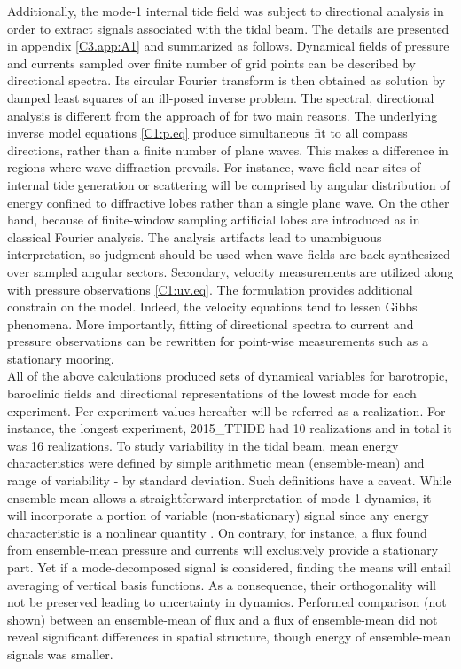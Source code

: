 \documentclass[12pt]{article}
\begin{document}
Additionally, the mode-1 internal tide field was subject to directional analysis in order to 
extract signals associated with the tidal beam. The details are presented in appendix 
\ref{C3.app:A1} and summarized as follows. Dynamical fields of pressure and currents sampled over 
finite number of grid points can be described by directional spectra. Its circular Fourier 
transform is then obtained as solution by damped least squares of an ill-posed inverse problem. The 
spectral, directional analysis is different from the approach of \cite{zhao2010long} for two main 
reasons. The underlying inverse model equations \eqref{C1:p.eq} produce simultaneous fit to all 
compass directions, rather than a finite number of plane waves. This makes a difference in regions 
where wave diffraction prevails. For instance, wave field near sites of internal tide generation or 
scattering will be comprised by angular distribution of energy confined to diffractive lobes 
\citep[e.g.,][]{munroe2005topographic, johnston2003internal} rather than a single plane wave. On 
the other hand, because of finite-window sampling artificial lobes are introduced as in classical 
Fourier analysis. The analysis artifacts lead to unambiguous interpretation, so judgment should be 
used when wave fields are back-synthesized over sampled angular sectors. Secondary, 
velocity measurements are utilized along with pressure observations \eqref{C1:uv.eq}. The 
formulation provides additional constrain on the model. Indeed, the velocity equations tend to 
lessen Gibbs phenomena. More importantly, fitting of directional spectra to current and pressure 
observations can be rewritten for point-wise measurements such as a stationary mooring.\\

All of the above calculations produced sets of dynamical variables for barotropic, baroclinic 
fields and directional representations of the lowest mode for each experiment. Per experiment 
values hereafter will be referred as a realization. For instance, the longest 
experiment, 2015\_TTIDE had 10 realizations and in total it was 16 realizations. To study 
variability in the tidal beam, mean energy characteristics were defined by simple arithmetic mean 
(ensemble-mean) and range of variability - by standard deviation. Such definitions have a caveat. 
While ensemble-mean allows a straightforward interpretation of mode-1 dynamics, it will incorporate 
a portion of variable (non-stationary) signal since any energy characteristic is a nonlinear 
quantity \citep{zaron2014time}. On contrary, for instance, a flux found from ensemble-mean pressure 
and currents will exclusively provide a stationary part. Yet if a mode-decomposed signal is 
considered, finding the means will entail averaging of vertical basis functions. As a consequence, 
their orthogonality will not be preserved leading to uncertainty in dynamics. Performed 
comparison (not shown) between an ensemble-mean of flux and a flux of ensemble-mean did not reveal 
significant differences in spatial structure, though energy of ensemble-mean signals was smaller. 
\end{document}
